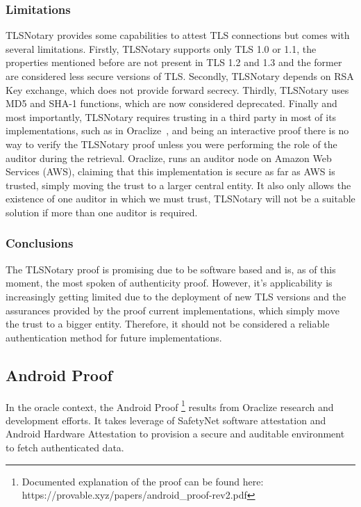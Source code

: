 \subsubsection{Limitations}
TLSNotary provides some capabilities to attest TLS connections but comes with several limitations. Firstly, TLSNotary supports only TLS 1.0 or 1.1, the properties mentioned before are not present in TLS 1.2 and 1.3 and the former are considered less secure versions of TLS. Secondly, TLSNotary depends on RSA Key exchange, which does not provide forward secrecy. Thirdly, TLSNotary uses MD5 and SHA-1 functions, which are now considered deprecated. Finally and most importantly, TLSNotary requires trusting in a third party in most of its implementations, such as in Oraclize~\cite{Oraclize}, and being an interactive proof there is no way to verify the TLSNotary proof unless you were performing the role of the auditor during the retrieval. Oraclize, runs an auditor node on Amazon Web Services (AWS), claiming that this implementation is secure as far as AWS is trusted, simply moving the trust to a larger central entity. It also only allows the existence of one auditor in which we must trust, TLSNotary will not be a suitable solution if more than one auditor is required.


\subsubsection{Conclusions}
The TLSNotary proof is promising due to be software based and is, as of this moment, the most spoken of authenticity proof. However, it's applicability is increasingly getting limited due to the deployment of new TLS versions and the assurances provided by the proof current implementations, which simply move the trust to a bigger entity. Therefore, it should not be considered a reliable authentication method for future implementations.

\subsection{Android Proof}

In the oracle context, the Android Proof \footnote{Documented explanation of the proof can be found here: https://provable.xyz/papers/android\_proof-rev2.pdf} results from Oraclize research and development efforts. It takes leverage of SafetyNet software attestation and Android Hardware Attestation to provision a secure and auditable environment to fetch authenticated data.

